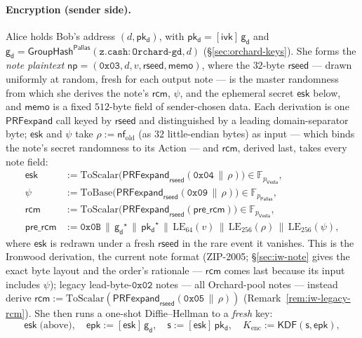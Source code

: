 \documentclass[11pt,a4paper]{article}
\theoremstyle{definition}
\newcommand{\F}{\mathbb{F}}
\newcommand{\nfsym}{\mathsf{nf}}
\newcommand{\Pallas}{\ensuremath{\mathsf{Pallas}}}
\newcommand{\Vesta}{\ensuremath{\mathsf{Vesta}}}
\newcommand{\GroupHash}{\ensuremath{\mathsf{GroupHash}}}
\newcommand{\ivk}{\ensuremath{\mathsf{ivk}}}
\newcommand{\pkd}{\ensuremath{\mathsf{pk_d}}}
\newcommand{\gd}{\ensuremath{\mathsf{g_d}}}
\newcommand{\rcm}{\ensuremath{\mathsf{rcm}}}
\begin{document}
\paragraph{Encryption (sender side).} Alice holds Bob's address $(d, \pkd)$,
with $\pkd = [\ivk]\,\gd$ and $\gd = \GroupHash^{\Pallas}(\mathtt{z.cash:Orchard\text{-}gd}, d)$
(\S\ref{sec:orchard-keys}). She forms the \emph{note plaintext}
$\mathsf{np} = (\mathtt{0x03}, d, v, \mathsf{rseed}, \mathsf{memo})$, where the
$32$-byte $\mathsf{rseed}$ --- drawn uniformly at random, fresh for each output
note --- is the master randomness from which she derives the
note's $\rcm$, $\psi$, and the ephemeral secret $\mathsf{esk}$ below, and
$\mathsf{memo}$ is a fixed $512$-byte field of sender-chosen data. Each
derivation is one $\mathsf{PRFexpand}$ call keyed by $\mathsf{rseed}$ and
distinguished by a leading domain-separator byte; $\mathsf{esk}$ and $\psi$
take $\rho := \nfsym_{\mathrm{old}}$ (as $32$ little-endian bytes) as input
--- which binds the note's secret randomness to its Action --- and $\rcm$,
derived last, takes every note field:
\begin{align*}
\mathsf{esk} &:= \mathrm{ToScalar}\bigl(\mathsf{PRFexpand}_{\mathsf{rseed}}(\mathtt{0x04} \,\|\, \rho)\bigr) \in \F_{p_{\Vesta}}, \\
\psi   &:= \mathrm{ToBase}\bigl(\mathsf{PRFexpand}_{\mathsf{rseed}}(\mathtt{0x09} \,\|\, \rho)\bigr) \in \F_{p_{\Pallas}}, \\
\rcm   &:= \mathrm{ToScalar}\bigl(\mathsf{PRFexpand}_{\mathsf{rseed}}(\mathsf{pre\_rcm})\bigr) \in \F_{p_{\Vesta}}, \\
\mathsf{pre\_rcm} &:= \mathtt{0x0B} \,\|\, \gd^\star \,\|\, \pkd^\star \,\|\, \mathrm{LE}_{64}(v) \,\|\, \mathrm{LE}_{256}(\rho) \,\|\, \mathrm{LE}_{256}(\psi),
\end{align*}
where $\mathsf{esk}$ is redrawn under a fresh $\mathsf{rseed}$ in the rare event
it vanishes. This is the Ironwood derivation, the current note format
(ZIP-2005; \S\ref{sec:iw-note} gives the exact byte layout and the order's
rationale --- $\rcm$ comes last because its input includes $\psi$); legacy
lead-byte-$\mathtt{0x02}$ notes --- all Orchard-pool notes --- instead
derive
$\rcm := \mathrm{ToScalar}(\mathsf{PRFexpand}_{\mathsf{rseed}}(\mathtt{0x05}
\,\|\, \rho))$ (Remark~\ref{rem:iw-legacy-rcm}). She then runs a one-shot
Diffie--Hellman to a \emph{fresh} key:
\[
\mathsf{esk} \;\text{(above)}, \quad
\mathsf{epk} := [\mathsf{esk}]\,\gd, \quad
\mathsf{s} := [\mathsf{esk}]\,\pkd, \quad
K_{\mathrm{enc}} := \mathsf{KDF}(\mathsf{s}, \mathsf{epk}),
\]
\end{document}
